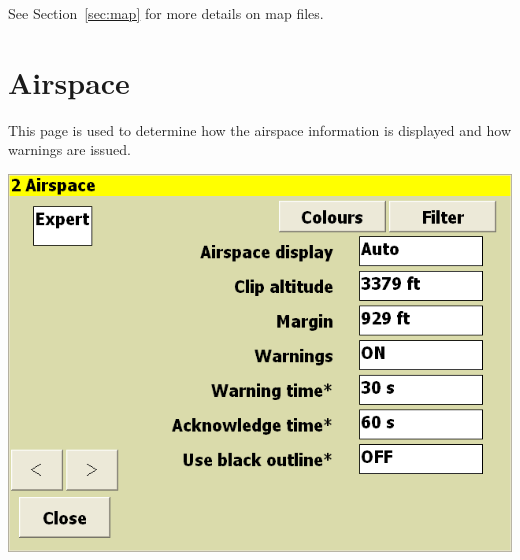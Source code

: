 \documentclass[a4paper,12pt]{refrep}
\begin{document}
See Section~\ref{sec:map} for more details on map files.


\clearpage
\section{Airspace}

This page is used to determine how the airspace information is
displayed and how warnings are issued.

\begin{center}
\includegraphics[angle=0,width=\linewidth,keepaspectratio='true']{figures/config-1.png}
\end{center}
\end{document}
